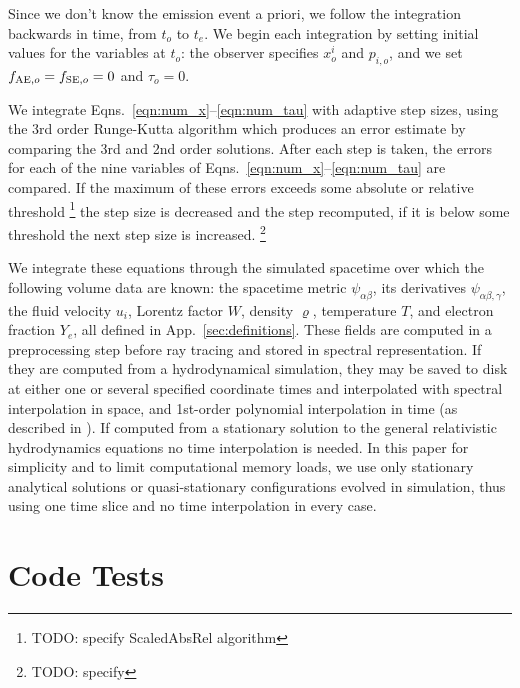 \documentclass[aps,floatfix,prd,superscriptaddress,twocolumn]{revtex4-1}
\begin{document}
Since we don't know the emission event a priori,
we follow the integration backwards in time,
from $t_o$ to $t_e$.
We begin each integration by setting initial values for the variables at $t_o$:
the observer specifies $x^i_o$ and $p_{i,o}$,
and we set $f_{{\rm AE},o}=f_{{\rm SE},o}=0$ and $\tau_o=0$.

We integrate Eqns.~\ref{eqn:num_x}--\ref{eqn:num_tau} with adaptive step sizes,
using the 3rd order Runge-Kutta algorithm
which produces an error estimate by comparing the 3rd and 2nd order solutions.
After each step is taken, the errors for each of the nine variables of
Eqns.~\ref{eqn:num_x}--\ref{eqn:num_tau} are compared.
If the maximum of these errors exceeds some absolute or relative threshold
\footnote{TODO: specify ScaledAbsRel algorithm}
the step size is decreased and the step recomputed,
if it is below some threshold the next step size is increased.
\footnote{TODO: specify}

We integrate these equations through the simulated spacetime
over which the following volume data are known:
the spacetime metric $\psi_{\alpha\beta}$,
its derivatives $\psi_{\alpha\beta,\gamma}$,
the fluid velocity $u_i$,
Lorentz factor $W$,
density $\varrho$,
temperature $T$,
and electron fraction $Y_e$,
all defined in App.~\ref{sec:definitions}.
These fields are computed in a preprocessing step before ray tracing
and stored in spectral representation.
If they are computed from a hydrodynamical simulation, they may be saved to disk
at either one or several specified coordinate times and interpolated
with spectral interpolation in space,
and 1st-order polynomial interpolation in time
(as described in \cite[App.~B]{bohn2016-code}).
If computed from a stationary solution to the
general relativistic hydrodynamics equations no time interpolation is needed.
In this paper for simplicity and to limit computational memory loads,
we use only stationary analytical solutions or
quasi-stationary configurations evolved in simulation,
thus using one time slice and no time interpolation in every case.

\section{Code Tests}
\label{sec:tests}
\end{document}

